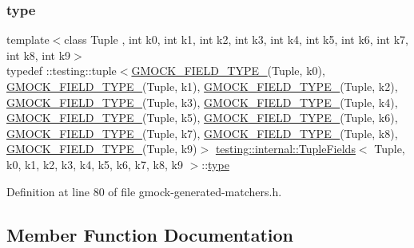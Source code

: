 \subsubsection{\texorpdfstring{type}{type}}
{\footnotesize\ttfamily template$<$class Tuple , int k0, int k1, int k2, int k3, int k4, int k5, int k6, int k7, int k8, int k9$>$ \\
typedef \+::testing\+::tuple$<$\hyperlink{gmock-generated-matchers_8h_acf3e27de83a73f0d873da1cd471e505b}{G\+M\+O\+C\+K\+\_\+\+F\+I\+E\+L\+D\+\_\+\+T\+Y\+P\+E\+\_\+}(Tuple, k0), \hyperlink{gmock-generated-matchers_8h_acf3e27de83a73f0d873da1cd471e505b}{G\+M\+O\+C\+K\+\_\+\+F\+I\+E\+L\+D\+\_\+\+T\+Y\+P\+E\+\_\+}(Tuple, k1), \hyperlink{gmock-generated-matchers_8h_acf3e27de83a73f0d873da1cd471e505b}{G\+M\+O\+C\+K\+\_\+\+F\+I\+E\+L\+D\+\_\+\+T\+Y\+P\+E\+\_\+}(Tuple, k2), \hyperlink{gmock-generated-matchers_8h_acf3e27de83a73f0d873da1cd471e505b}{G\+M\+O\+C\+K\+\_\+\+F\+I\+E\+L\+D\+\_\+\+T\+Y\+P\+E\+\_\+}(Tuple, k3), \hyperlink{gmock-generated-matchers_8h_acf3e27de83a73f0d873da1cd471e505b}{G\+M\+O\+C\+K\+\_\+\+F\+I\+E\+L\+D\+\_\+\+T\+Y\+P\+E\+\_\+}(Tuple, k4), \hyperlink{gmock-generated-matchers_8h_acf3e27de83a73f0d873da1cd471e505b}{G\+M\+O\+C\+K\+\_\+\+F\+I\+E\+L\+D\+\_\+\+T\+Y\+P\+E\+\_\+}(Tuple, k5), \hyperlink{gmock-generated-matchers_8h_acf3e27de83a73f0d873da1cd471e505b}{G\+M\+O\+C\+K\+\_\+\+F\+I\+E\+L\+D\+\_\+\+T\+Y\+P\+E\+\_\+}(Tuple, k6), \hyperlink{gmock-generated-matchers_8h_acf3e27de83a73f0d873da1cd471e505b}{G\+M\+O\+C\+K\+\_\+\+F\+I\+E\+L\+D\+\_\+\+T\+Y\+P\+E\+\_\+}(Tuple, k7), \hyperlink{gmock-generated-matchers_8h_acf3e27de83a73f0d873da1cd471e505b}{G\+M\+O\+C\+K\+\_\+\+F\+I\+E\+L\+D\+\_\+\+T\+Y\+P\+E\+\_\+}(Tuple, k8), \hyperlink{gmock-generated-matchers_8h_acf3e27de83a73f0d873da1cd471e505b}{G\+M\+O\+C\+K\+\_\+\+F\+I\+E\+L\+D\+\_\+\+T\+Y\+P\+E\+\_\+}(Tuple, k9)$>$ \hyperlink{classtesting_1_1internal_1_1TupleFields}{testing\+::internal\+::\+Tuple\+Fields}$<$ Tuple, k0, k1, k2, k3, k4, k5, k6, k7, k8, k9 $>$\+::\hyperlink{classtesting_1_1internal_1_1TupleFields_a5480877377ebc94bf3a6c6cab5c369bc}{type}}



Definition at line 80 of file gmock-\/generated-\/matchers.\+h.



\subsection{Member Function Documentation}
\mbox{\label{classtesting_1_1internal_1_1TupleFields_a020eefb4630e6dffe8bcadd0a70b1bab}} 
